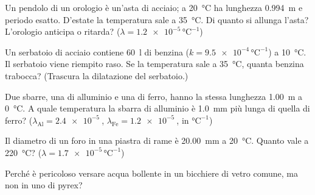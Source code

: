 \begin{esercizio}
Un pendolo di un orologio è un'asta di acciaio; a \SI{20}{\celsius} ha lunghezza \SI{0,994}{\metre} e periodo esatto. D'estate la temperatura sale a \SI{35}{\celsius}. Di quanto si allunga l'asta? L'orologio anticipa o ritarda? ($\lambda = \num{1,2e-5}\,\si{\celsius}^{-1}$)\\
\end{esercizio}

\begin{esercizio}
Un serbatoio di acciaio contiene \SI{60}{\litre} di benzina ($k = \num{9,5e-4}\,\si{\celsius}^{-1}$) a \SI{10}{\celsius}. Il serbatoio viene riempito raso. Se la temperatura sale a \SI{35}{\celsius}, quanta benzina trabocca? (Trascura la dilatazione del serbatoio.)\\
\end{esercizio}

\begin{esercizio}
Due sbarre, una di alluminio e una di ferro, hanno la stessa lunghezza \SI{1,00}{\metre} a \SI{0}{\celsius}. A quale temperatura la sbarra di alluminio è \SI{1,0}{\milli\metre} più lunga di quella di ferro? ($\lambda_{\text{Al}} = \SI{2,4e-5}{}$, $\lambda_{\text{Fe}} = \SI{1,2e-5}{}$, in $\si{\celsius}^{-1}$)\\
\end{esercizio}

\begin{esercizio}
Il diametro di un foro in una piastra di rame è \SI{20,00}{\milli\metre} a \SI{20}{\celsius}. Quanto vale a \SI{220}{\celsius}? ($\lambda = \num{1,7e-5}\,\si{\celsius}^{-1}$)\\
\end{esercizio}

\begin{esercizio}
Perché è pericoloso versare acqua bollente in un bicchiere di vetro comune, ma non in uno di pyrex?\\
\end{esercizio}

